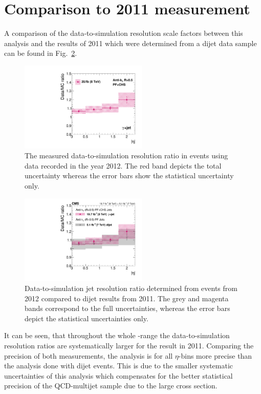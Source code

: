 \section{Comparison to 2011 measurement}
\label{res:sec:comparison_2010}
A comparison of the data-to-simulation resolution scale factors \rhores between this analysis and the results of 2011 which were determined from a dijet data sample~\cite{bib:Matthias_Thesis} can be found in Fig.~\ref{res:fig:Comparison_2011}.
\begin{figure}[!t]
 \centering
    \includegraphics[width=0.54\textwidth]{figures/resolution/results/MySingleFinalResult.pdf}
  \caption{The measured data-to-simulation resolution ratio in \GAMJET events using data recorded in the year 2012.
           The red band depicts the total uncertainty whereas the error bars show the statistical uncertainty only.}
  \label{res:fig:RatioFinal}
\end{figure}
\begin{figure}[!t]
 \centering
    \includegraphics[width=0.54\textwidth]{figures/resolution/results/Figure_43_left_Teresa_cmsStyle_updated_5.pdf}
  \caption{Data-to-simulation jet \pt resolution ratio determined from \GAMJET events from 2012 compared to dijet results from 2011.
           The grey and magenta bands correspond to the full uncertainties, whereas the error bars depict the statistical uncertainties only.}
  \label{res:fig:Comparison_2011}
\end{figure}
It can be seen, that throughout the whole \etajet-range the data-to-simulation resolution ratios \rhores are systematically larger for the result in 2011. 
Comparing the precision of both measurements, the \GAMJET analysis is for all $\eta$-bins more precise than the analysis done with dijet events.
This is due to the smaller systematic uncertainties of this analysis which compensates for the better statistical precision of the QCD-multijet sample due to the large cross section.


